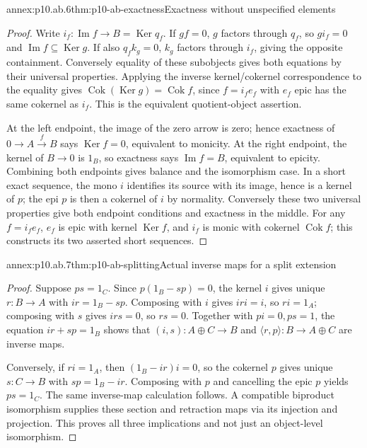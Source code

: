 \begin{annexitem}{annex:p10.ab.6}{thm:p10-ab-exactness}{Exactness without unspecified elements}
\begin{proof}
Write \(i_f:\operatorname{Im}f\to B=\operatorname{Ker}q_f\).
If \(gf=0\), \(g\) factors through \(q_f\), so \(g i_f=0\)
and \(\operatorname{Im}f\subseteq\operatorname{Ker}g\).
If also \(q_f k_g=0\), \(k_g\) factors through \(i_f\), giving
the opposite containment. Conversely equality of these subobjects
gives both equations by their universal properties.
Applying the inverse kernel/cokernel correspondence to the equality
gives \(\operatorname{Cok}(\operatorname{Ker}g)=\operatorname{Cok}f\),
since \(f=i_fe_f\) with \(e_f\) epic has the same cokernel as \(i_f\).
This is the equivalent quotient-object assertion.

At the left endpoint, the image of the zero arrow is zero; hence
exactness of \(0\to A\xrightarrow f B\) says \(\operatorname{Ker}f=0\),
equivalent to monicity. At the right endpoint, the kernel of \(B\to0\)
is \(1_B\), so exactness says \(\operatorname{Im}f=B\), equivalent
to epicity. Combining both endpoints gives balance and the isomorphism
case. In a short exact sequence, the mono \(i\) identifies its source
with its image, hence is a kernel of \(p\); the epi \(p\) is then a
cokernel of \(i\) by normality. Conversely these two universal
properties give both endpoint conditions and exactness in the middle.
For any \(f=i_fe_f\), \(e_f\) is epic with kernel \(\operatorname{Ker}f\),
and \(i_f\) is monic with cokernel \(\operatorname{Cok}f\); this
constructs its two asserted short sequences.
\end{proof}
\end{annexitem}

\begin{annexitem}{annex:p10.ab.7}{thm:p10-ab-splitting}{Actual inverse maps for a split extension}
\begin{proof}
Suppose \(ps=1_C\). Since \(p(1_B-sp)=0\), the kernel \(i\)
gives unique \(r:B\to A\) with \(ir=1_B-sp\).
Composing with \(i\) gives \(iri=i\), so \(ri=1_A\);
composing with \(s\) gives \(irs=0\), so \(rs=0\).
Together with \(pi=0,ps=1\), the equation \(ir+sp=1_B\)
shows that \((i,s):A\oplus C\to B\) and
\(\langle r,p\rangle:B\to A\oplus C\) are inverse maps.

Conversely, if \(ri=1_A\), then \((1_B-ir)i=0\), so the cokernel
\(p\) gives unique \(s:C\to B\) with \(sp=1_B-ir\).
Composing with \(p\) and cancelling the epic \(p\) yields \(ps=1_C\).
The same inverse-map calculation follows. A compatible biproduct
isomorphism supplies these section and retraction maps via its injection
and projection. This proves all three implications and not just an
object-level isomorphism.
\end{proof}
\end{annexitem}

